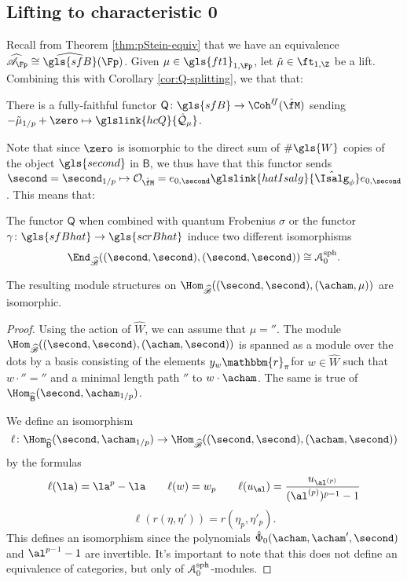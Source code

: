 \subsection{Lifting to characteristic 0}


Recall from Theorem \ref{thm:pStein-equiv} that we have an equivalence $\widehat{\mathscr{A}}_{\Fp}\cong \widehat{\gls{sfB}}(\Fp)$. Given $\mu\in \gls{ft1}_{1,\Fp}$, let $\tilde{\mu}\in \ft_{1,\Z}$ be a lift. Combining this with Corollary \ref{cor:Q-splitting}, we that that:
\begin{lemma}\label{lem:Gamma-iso}
There is a fully-faithful functor $\mathsf{Q}\colon \gls{sfB}\to  \Coh^{\ell \!f}(\hat{\fM})$ sending $- \tilde{\mu}_{1/p}+\zero\mapsto \glslink{hcQ}{\mathcal{\hat Q}_\mu}$.  \end{lemma}
Note that since $\zero$ is isomorphic to the direct sum of $\# \gls{W}$ copies of the object $\gls{second}$ in $\mathsf{B}$, we thus have that this functor sends $\second=\second_{1/p}\mapsto \mathcal{O}_{\hat{\fM}}=e_{0,\second}\glslink{hatIsalg}{\hat{\Isalg}_\phi} e_{0,\second}$. This means that:
\begin{lemma}\label{lem:Frob-or-B}
  The functor $\mathsf{Q}$ when combined with quantum Frobenius $\sigma$ or the functor $\gamma\colon \gls{sfBhat}\to \gls{scrBhat}$ induce two different isomorphisms \[\End_{\widehat{\mathscr{B}}}((\second, \second),(\second, \second))\cong \EuScript{A}^{\operatorname{sph}}_0.\]

The resulting module structures on $\Hom_{\widehat{\mathscr{B}}}( (\second,\second),(\acham,\mu))$ are isomorphic.  
\end{lemma}
\begin{proof}
  Using the action of $\widehat{W}$, we can assume that $\mu=\second$.
  The module $\Hom_{\widehat{\mathscr{B}}}( (\second,\second),(\acham,\second))$ is spanned as a module over the dots by a basis consisting of the elements $y_w\mathbbm{r}_{\pi}$for $w\in \widehat{W}$ such that $w\cdot \second=\second$ and  a minimal length path $\second$ to $w\cdot \acham$.  The same is true of $\Hom_{\widehat{\mathsf{B}}}(\second,\acham_{1/p})$.

  We define an isomorphism \[\ell\colon \Hom_{\widehat{\mathsf{B}}}(\second,\acham_{1/p})\to \Hom_{\widehat{\mathscr{B}}}( (\second,\second),(\acham,\second)) \]
by the formulas
\[ \ell(\la)=\la^p-\la \qquad \ell(w)=w_p\qquad\ell(u_{\al})=\frac{u_{\al^{(p)}}}{(\al^{(p)})^{p-1}-1}\]
\[\ell(r(\eta,\eta')) =r(\eta_{p},\eta'_{p}).\]
This defines an isomorphism since the polynomials $\hat \Phi_0(\acham,\acham',\second)$ and $\al^{p-1}-1$ are invertible.  It's important to note that this does not define an equivalence of categories, but only of $\EuScript{A}^{\operatorname{sph}}_0$-modules.
\end{proof}

